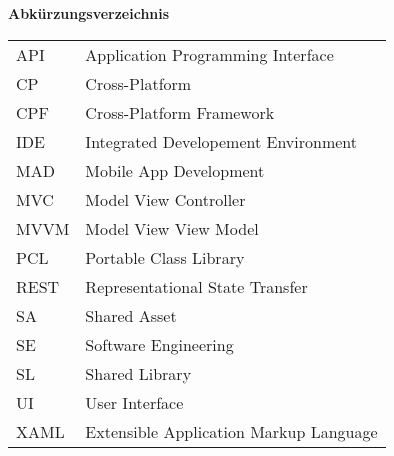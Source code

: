 %
%
% 
% 

\begin{center}
{\Large\bfseries Abkürzungsverzeichnis}
\end{center}

\begin{table*}[htbp]
		\begin{tabular}{ll}
			API &	Application Programming Interface\\
			CP  &	Cross-Platform \\
			CPF &	Cross-Platform Framework \\
			IDE	&	Integrated Developement Environment\\
			MAD &	Mobile App Development \\
			MVC &	Model View Controller\\
			MVVM&	Model View View Model\\
			PCL	&	Portable Class Library\\
			REST&	Representational State Transfer\\
			SA 	&	Shared Asset\\
			SE	&	Software Engineering\\
			SL	&	Shared Library\\
			UI	&	User Interface\\
			XAML&	Extensible Application Markup Language\\
		\end{tabular}
\end{table*}